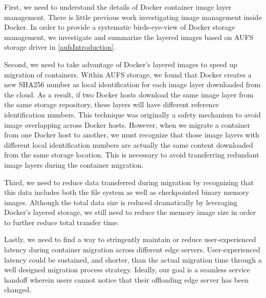 First, we need to understand the details of Docker container image layer management. There is little previous work investigating image management inside Docker. In order to provide a systematic birds-eye-view of Docker storage management, we investigate and summarize the layered images based on AUFS storage driver in \ref{aufsIntroduction}.

Second, we need to take advantage of Docker's layered images to speed up migration of containers. Within AUFS storage, we found that Docker creates a new SHA256 number as local  identification for each image layer downloaded from the cloud. 
As a result, if two Docker hosts download the same image layer from the same storage repository, these layers will have different reference identification numbers. This technique was originally a safety mechanism to avoid image overlapping across Docker hosts\cite{dockerlayer}. 
However, when we migrate a container from one Docker host to another, we must recognize that those image layers with different local identification numbers are actually the same content downloaded from the same storage location. This is necessary to avoid transferring redundant image layers during the container migration.

Third, we need to reduce data transferred during migration by recognizing that this data includes both the file system as well as checkpointed binary memory images. Although the total data size is reduced dramatically by leveraging Docker's layered storage, we still need to reduce the memory image size in order to further reduce total transfer time. 

Lastly, we need to find a way to stringently maintain or reduce user-experienced latency during container migration across different edge servers. User-experienced latency could be sustained, and shorter, than the actual migration time through a well designed migration process strategy. Ideally, our goal is a seamless service handoff wherein users cannot notice that their offloading edge server has been changed.

